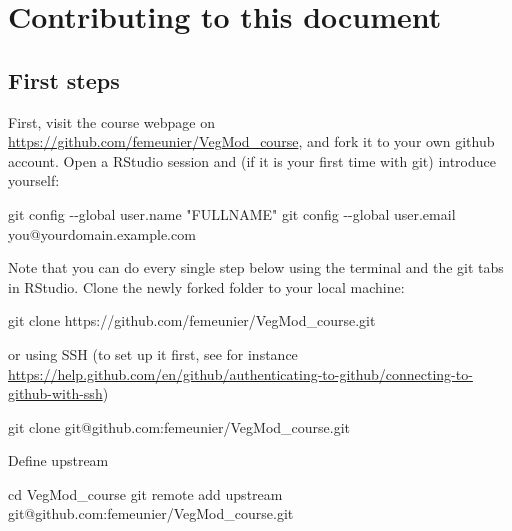 \documentclass[
  12pt,
  oneside]{book}
\newenvironment{Shaded}{\begin{snugshade}}{\end{snugshade}}
\newcommand{\AttributeTok}[1]{\textcolor[rgb]{0.77,0.63,0.00}{#1}}
\newcommand{\BuiltInTok}[1]{#1}
\newcommand{\FunctionTok}[1]{\textcolor[rgb]{0.00,0.00,0.00}{#1}}
\newcommand{\NormalTok}[1]{#1}
\newcommand{\StringTok}[1]{\textcolor[rgb]{0.31,0.60,0.02}{#1}}
\begin{document}
\hypertarget{contributing-to-this-document}{%
\chapter*{Contributing to this document}\label{contributing-to-this-document}}

\hypertarget{first-steps}{%
\section*{First steps}\label{first-steps}}

First, visit the course webpage on \url{https://github.com/femeunier/VegMod_course}, and fork it to your own github account. Open a RStudio session and (if it is your first time with git) introduce yourself:

\begin{Shaded}
\begin{Highlighting}[]
\FunctionTok{git}\NormalTok{ config }\AttributeTok{{-}{-}global}\NormalTok{ user.name }\StringTok{"FULLNAME"}
\FunctionTok{git}\NormalTok{ config }\AttributeTok{{-}{-}global}\NormalTok{ user.email you@yourdomain.example.com}
\end{Highlighting}
\end{Shaded}

Note that you can do every single step below using the terminal and the git tabs in RStudio. Clone the newly forked folder to your local machine:

\begin{Shaded}
\begin{Highlighting}[]
\FunctionTok{git}\NormalTok{ clone https://github.com/femeunier/VegMod\_course.git}
\end{Highlighting}
\end{Shaded}

or using SSH (to set up it first, see for instance \url{https://help.github.com/en/github/authenticating-to-github/connecting-to-github-with-ssh})

\begin{Shaded}
\begin{Highlighting}[]
\FunctionTok{git}\NormalTok{ clone git@github.com:femeunier/VegMod\_course.git}
\end{Highlighting}
\end{Shaded}

Define upstream

\begin{Shaded}
\begin{Highlighting}[]
\BuiltInTok{cd}\NormalTok{ VegMod\_course}
\FunctionTok{git}\NormalTok{ remote add upstream git@github.com:femeunier/VegMod\_course.git}
\end{Highlighting}
\end{Shaded}
\end{document}
